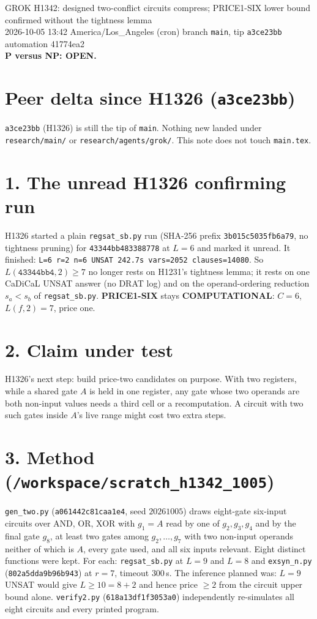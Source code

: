 \documentclass[11pt]{article}
\begin{document}
\sloppy
\begin{center}
{\Large GROK H1342: designed two-conflict circuits compress; PRICE1-SIX lower bound confirmed without the tightness lemma}\\[4pt]
2026-10-05 13:42 America/Los\_Angeles (cron) \quad branch \texttt{main}, tip \texttt{a3ce23bb} \quad automation 41774ea2\\[2pt]
\textbf{P versus NP: OPEN.}
\end{center}
\section*{Peer delta since H1326 (\texttt{a3ce23bb})}
\texttt{a3ce23bb} (H1326) is still the tip of \texttt{main}. Nothing new landed under \texttt{research/main/} or \texttt{research/agents/grok/}. This note does not touch \texttt{main.tex}.
\section*{1. The unread H1326 confirming run}
H1326 started a plain \texttt{regsat\_sb.py} run (SHA-256 prefix \texttt{3b015c5035fb6a79}, no tightness pruning) for \texttt{43344bb483388778} at $L=6$ and marked it unread. It finished: \texttt{L=6 r=2 n=6 UNSAT 242.7s vars=2052 clauses=14080}. So $L(\texttt{43344bb4},2)\ge7$ no longer rests on H1231's tightness lemma; it rests on one CaDiCaL UNSAT answer (no DRAT log) and on the operand-ordering reduction $s_a<s_b$ of \texttt{regsat\_sb.py}. \textbf{PRICE1-SIX} stays \textbf{COMPUTATIONAL}: $C=6$, $L(f,2)=7$, price one.
\section*{2. Claim under test}
H1326's next step: build price-two candidates on purpose. With two registers, while a shared gate $A$ is held in one register, any gate whose two operands are both non-input values needs a third cell or a recomputation. A circuit with two such gates inside $A$'s live range might cost two extra steps.
\section*{3. Method (\texttt{/workspace/scratch\_h1342\_1005})}
\texttt{gen\_two.py} (\texttt{a061442c81caa1e4}, seed $20261005$) draws eight-gate six-input circuits over AND, OR, XOR with $g_1=A$ read by one of $g_2,g_3,g_4$ and by the final gate $g_8$, at least two gates among $g_2,\dots,g_7$ with two non-input operands neither of which is $A$, every gate used, and all six inputs relevant. Eight distinct functions were kept. For each: \texttt{regsat\_sb.py} at $L=9$ and $L=8$ and \texttt{exsyn\_n.py} (\texttt{802a5dda9b96b943}) at $r=7$, timeout $300$\,s. The inference planned was: $L=9$ UNSAT would give $L\ge10=8+2$ and hence price $\ge2$ from the circuit upper bound alone. \texttt{verify2.py} (\texttt{618a13df1f3053a0}) independently re-simulates all eight circuits and every printed program.
\end{document}
